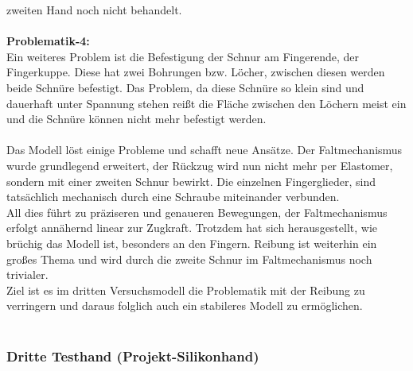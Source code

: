 \documentclass[titlepage,12pt,twoside]{article}
\begin{document}
zweiten Hand noch nicht behandelt. \\
\\
\textbf{Problematik-4: } \\
Ein weiteres Problem ist die Befestigung der Schnur am Fingerende, der Fingerkuppe. Diese hat zwei Bohrungen bzw. Löcher, zwischen diesen werden beide Schnüre befestigt. Das Problem, da diese Schnüre so klein sind und dauerhaft 
unter Spannung stehen reißt die Fläche zwischen den Löchern meist ein und die Schnüre können nicht mehr befestigt werden. \\
\\
Das Modell löst einige Probleme und schafft neue Ansätze. Der Faltmechanismus wurde grundlegend erweitert, der Rückzug wird nun nicht mehr per Elastomer, sondern mit einer zweiten Schnur bewirkt.
Die einzelnen Fingerglieder, sind tatsächlich mechanisch durch eine Schraube miteinander verbunden. \\
All dies führt zu präziseren und genaueren Bewegungen, der Faltmechanismus erfolgt annähernd linear zur Zugkraft. Trotzdem hat sich herausgestellt, wie brüchig das Modell ist, besonders an den Fingern. Reibung ist weiterhin ein großes Thema und 
wird durch die zweite Schnur im Faltmechanismus noch trivialer. \\
Ziel ist es im dritten Versuchsmodell die Problematik mit der Reibung zu verringern und daraus folglich auch ein stabileres Modell zu ermöglichen.\\
\\

\subsubsection{Dritte Testhand (Projekt-Silikonhand)}
\end{document}
